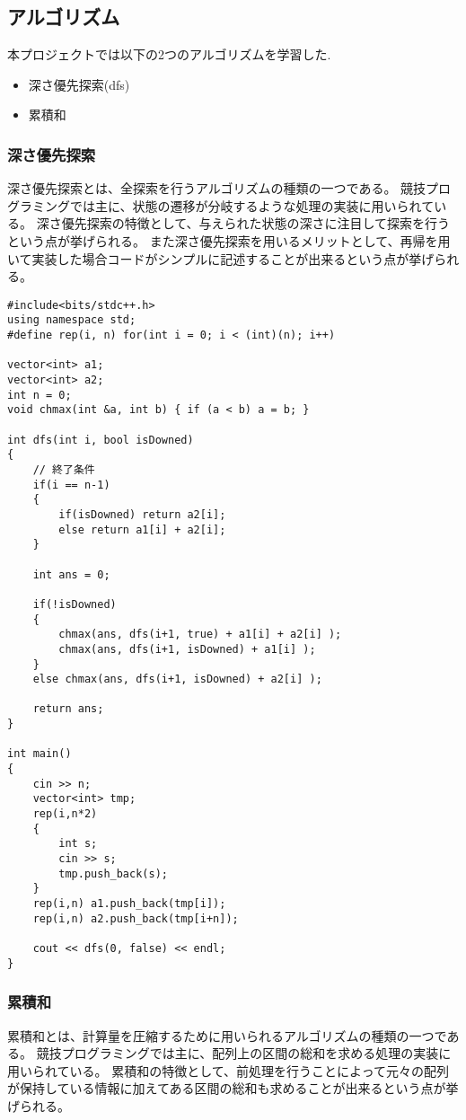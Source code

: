 \documentclass[11pt,a4paper]{jsarticle}
\begin{document}
\subsection{アルゴリズム}
本プロジェクトでは以下の2つのアルゴリズムを学習した.
\begin{itemize}
    \item 深さ優先探索(dfs)
    \item 累積和
\end{itemize}

\subsubsection{深さ優先探索}
深さ優先探索とは、全探索を行うアルゴリズムの種類の一つである。
競技プログラミングでは主に、状態の遷移が分岐するような処理の実装に用いられている。
深さ優先探索の特徴として、与えられた状態の深さに注目して探索を行うという点が挙げられる。
また深さ優先探索を用いるメリットとして、再帰を用いて実装した場合コードがシンプルに記述することが出来るという点が挙げられる。

\begin{lstlisting}[caption=深さ優先探索の実装例(ABC87 C問題),label=fuga]
#include<bits/stdc++.h>
using namespace std;
#define rep(i, n) for(int i = 0; i < (int)(n); i++)

vector<int> a1;
vector<int> a2;
int n = 0;
void chmax(int &a, int b) { if (a < b) a = b; }
 
int dfs(int i, bool isDowned)
{
    // 終了条件
    if(i == n-1)
    {
        if(isDowned) return a2[i];
        else return a1[i] + a2[i];
    }
    
    int ans = 0;
     
    if(!isDowned)
    {
        chmax(ans, dfs(i+1, true) + a1[i] + a2[i] );
        chmax(ans, dfs(i+1, isDowned) + a1[i] );
    }
    else chmax(ans, dfs(i+1, isDowned) + a2[i] );
 
    return ans;
}
 
int main()
{
    cin >> n;
    vector<int> tmp;
    rep(i,n*2)
    {
        int s;
        cin >> s;
        tmp.push_back(s);
    }
    rep(i,n) a1.push_back(tmp[i]);
    rep(i,n) a2.push_back(tmp[i+n]);
 
    cout << dfs(0, false) << endl;
}
\end{lstlisting}

\subsubsection{累積和}
累積和とは、計算量を圧縮するために用いられるアルゴリズムの種類の一つである。
競技プログラミングでは主に、配列上の区間の総和を求める処理の実装に用いられている。
累積和の特徴として、前処理を行うことによって元々の配列が保持している情報に加えてある区間の総和も求めることが出来るという点が挙げられる。
\end{document}
